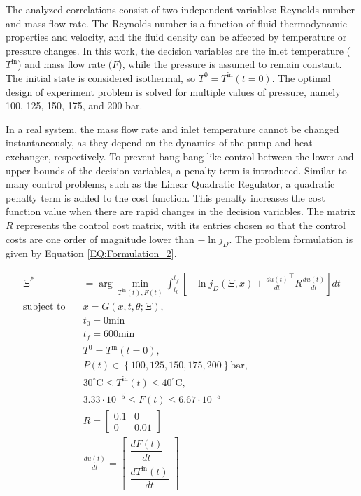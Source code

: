 \documentclass[../Article_Design_of_Experiment.tex]{subfiles}
\begin{document}
	The analyzed correlations consist of two independent variables: Reynolds number and mass flow rate. The Reynolds number is a function of fluid thermodynamic properties and velocity, and the fluid density can be affected by temperature or pressure changes. In this work, the decision variables are the inlet temperature ($T^{\text{in}}$) and mass flow rate ($F$), while the pressure is assumed to remain constant. The initial state is considered isothermal, so $T^0 = T^{\text{in}}(t=0)$. The optimal design of experiment problem is solved for multiple values of pressure, namely 100, 125, 150, 175, and 200 bar.
	
	In a real system, the mass flow rate and inlet temperature cannot be changed instantaneously, as they depend on the dynamics of the pump and heat exchanger, respectively. To prevent bang-bang-like control between the lower and upper bounds of the decision variables, a penalty term is introduced. Similar to many control problems, such as the Linear Quadratic Regulator, a quadratic penalty term is added to the cost function. This penalty increases the cost function value when there are rapid changes in the decision variables. The matrix $R$ represents the control cost matrix, with its entries chosen so that the control costs are one order of magnitude lower than $-\ln j_D$. The problem formulation is given by Equation \ref{EQ:Formulation_2}.
	
	{\footnotesize 
		\begin{equation} 
			\begin{aligned} \Xi^* &= \arg \min_{ T^{\text{in}}(t), F(t) } \int_{t_0}^{t_f} \left[ - \ln j_D(\Xi, \dot{x}) + \frac{du(t)}{dt}^\top R \frac{du(t)}{dt} \right] dt \\ 
				\text{subject to} \quad & \dot{x} = G(x, t, \theta; \Xi), \\ 
				& t_0 = 0 \text{min} \\ 
				& t_f = 600 \text{min} \\ 
				& T^{0} = T^{\text{in}}(t=0), \\ 
				& P(t) \in \left\{100, 125, 150, 175, 200\right\} \text{bar}, \\ 
				& 30^\circ\text{C} \leq T^{\text{in}}(t) \leq 40^\circ\text{C}, \\ 
				& 3.33 \cdot 10^{-5} \leq F(t) \leq 6.67 \cdot 10^{-5} \\
				& R = \begin{bmatrix} 0.1 & 0 \\ 0 & 0.01 \end{bmatrix} \\ 
				& \frac{du(t)}{dt} = \begin{bmatrix} \dfrac{dF(t)}{dt} \\ \dfrac{dT^{\text{in}}(t)}{dt} \end{bmatrix}
				\end{aligned} 
				\label{EQ:Formulation_2} 
			\end{equation} }
	
\end{document}
